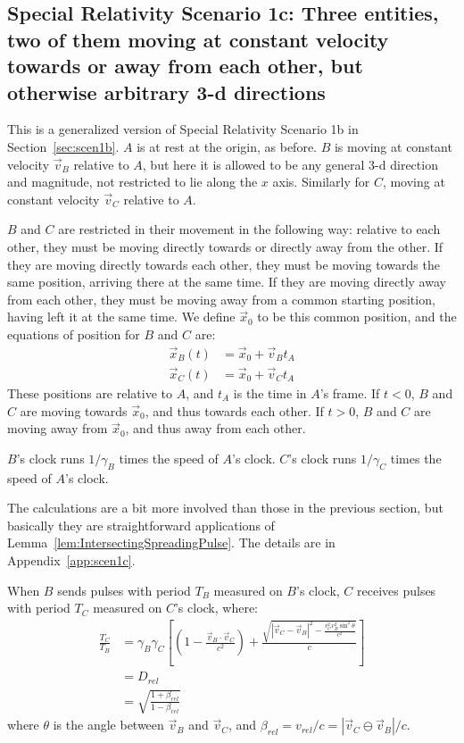 \documentclass[a4paper]{article}
\theoremstyle{plain}
\theoremstyle{definition}
\newcommand{\vect}[1]{\vec{#1}}
\begin{document}
\subsection{Special Relativity Scenario 1c: Three entities, two of them moving at constant velocity towards or away from each other, but otherwise arbitrary 3-d directions}
\label{sec:scen1c}

This is a generalized version of Special Relativity Scenario 1b in
Section~\ref{sec:scen1b}.
$A$ is at rest at the origin, as before.
$B$ is moving at constant velocity $\vect{v}_B$ relative to $A$, but
here it is allowed to be any general 3-d direction and magnitude, not
restricted to lie along the $x$ axis.
Similarly for $C$, moving at constant velocity $\vect{v}_C$ relative
to $A$.

$B$ and $C$ are restricted in their movement in the following way:
relative to each other, they must be moving directly towards or
directly away from the other.  If they are moving directly towards
each other, they must be moving towards the same position, arriving
there at the same time.  If they are moving directly away from each
other, they must be moving away from a common starting position,
having left it at the same time.  We define $\vect{x}_0$ to be this
common position, and the equations of position for $B$ and $C$ are:
\begin{align}
\vect{x}_B(t) & = \vect{x}_0 + \vect{v}_B t_A \label{eqn:scen1c-Bpos} \\
\vect{x}_C(t) & = \vect{x}_0 + \vect{v}_C t_A \label{eqn:scen1c-Cpos}
\end{align}
These positions are relative to $A$, and $t_A$ is the time in $A$'s
frame.  If $t < 0$, $B$ and $C$ are moving towards $\vect{x}_0$, and
thus towards each other.  If $t > 0$, $B$ and $C$ are moving away from
$\vect{x}_0$, and thus away from each other.

$B$'s clock runs $1/\gamma_B$ times the speed of $A$'s clock.
$C$'s clock runs $1/\gamma_C$ times the speed of $A$'s clock.

The calculations are a bit more involved than those in the previous
section, but basically they are straightforward applications of
Lemma~\ref{lem:IntersectingSpreadingPulse}.  The details are in
Appendix~\ref{app:scen1c}.

When $B$ sends pulses with period $T_B$ measured on $B$'s clock, $C$
receives pulses with period $T_C$ measured on $C$'s clock, where:
\begin{align}
\frac{T_C}{T_B}
  & = \gamma_B \gamma_C \left[ (1 - \frac{\vect{v}_B \cdot \vect{v}_C}{c^2}) + \frac{\sqrt{ |\vect{v}_C - \vect{v}_B|^2 - \frac{v_C^2 v_B^2 \sin^2 \theta}{c^2} }}{c} \right] \nonumber \\
  & = D_{rel} \nonumber \\
  & = \sqrt{ \frac{1+\beta_{rel}}{1-\beta_{rel}} } \nonumber
\end{align}
where $\theta$ is the angle between $\vect{v}_B$ and $\vect{v}_C$,
and $\beta_{rel} = v_{rel}/c = |\vect{v}_C \ominus \vect{v}_B|/c$.
\end{document}
